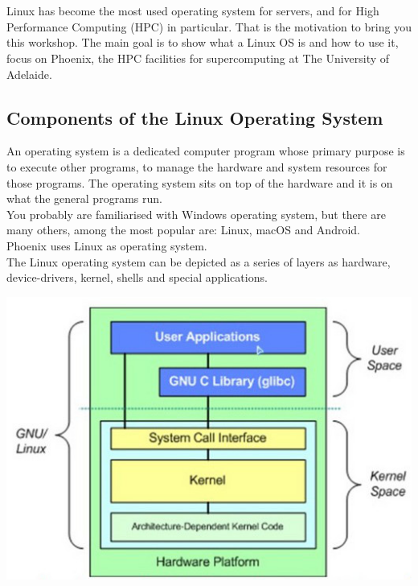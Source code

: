 
\chapter{\moduleTitle}

Linux has become the most used operating system for servers, and for High Performance Computing (HPC) in particular. That is the motivation to bring you this workshop.
The main goal is to show what a Linux OS is and how to use it, focus on Phoenix, the HPC facilities for supercomputing at The University of Adelaide.

\section{Components of the Linux Operating System}

An operating system is a dedicated computer program whose primary purpose is to execute other programs, to manage the hardware and system resources for those programs.
The operating system sits on top of the hardware and it is on what the general programs run.
\\
You probably are familiarised with Windows operating system, but there are many others, among the most popular are: Linux, macOS and Android.
\\
Phoenix uses Linux as operating system.
\\
The Linux operating system can be depicted as a series of layers as hardware, device-drivers, kernel, shells and special applications.

\includegraphics{linux_components}


